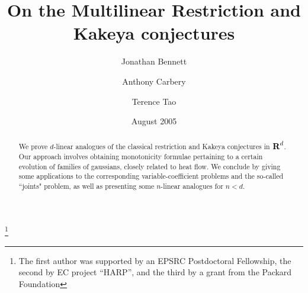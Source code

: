 \theoremstyle{definition}
  \newtheorem{definition}[subsection]{Definition}


\thanks{The first author was supported by an EPSRC Postdoctoral Fellowship,
the second by EC project ``HARP'', and the third by a grant from the Packard Foundation}

\title{On the Multilinear Restriction and Kakeya conjectures}
\date{August 2005}
\begin{abstract}
We prove $d$-linear analogues of the
classical restriction and Kakeya conjectures in ${\hbox{\bf R}}^d$. Our
approach involves obtaining monotonicity formulae pertaining to a
certain evolution of families of gaussians, closely related to
heat flow. We conclude by giving some applications to the
corresponding variable-coefficient problems and the so-called
``joints" problem, as well as presenting some $n$-linear analogues for $n<d$.
\end{abstract}

\author{Jonathan Bennett}
\address{School of Mathematics, University of Birmingham, Birmingham, B15 2TT, UK}

\author{Anthony Carbery}
\address{School of Mathematics, University of Edinburgh, Edinburgh, EH9 3JZ, UK}

\author{Terence Tao}
\address{Department of Mathematics, UCLA, Los Angeles CA 90095-1555}

\maketitle
